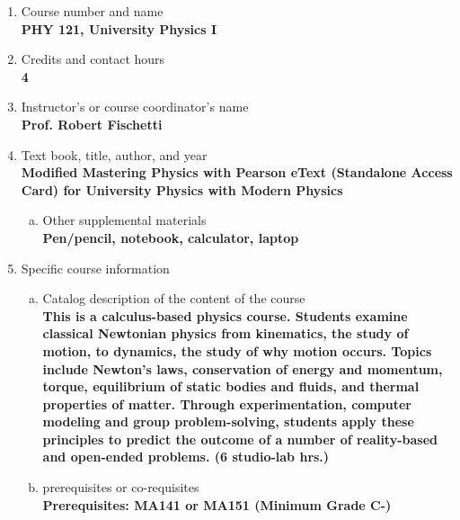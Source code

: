 \label{PHY121}  %
\begin{enumerate}[1.]
\item Course number and name\\
  {\bfseries
PHY 121, University Physics I
  }

\item Credits and contact hours\\
  {\bfseries
4
  }

\item Instructor's or course coordinator's name\\
  {\bfseries
Prof. Robert Fischetti
  }

\item Text book, title, author, and year\\
  {\bfseries
    Modified Mastering Physics with Pearson eText (Standalone Access Card) for University Physics with Modern Physics
  }
\begin{enumerate}[a.]
\item Other supplemental materials\\
  {\bfseries
    Pen/pencil, notebook, calculator, laptop
  }
\end{enumerate}

\item Specific course information
\begin{enumerate}[a.]
\item Catalog description of the content of the course\\
  {\bfseries
This is a calculus-based physics course. Students examine classical Newtonian physics from kinematics, the study of motion, to dynamics, the study of why motion occurs. Topics include Newton's laws, conservation of energy and momentum, torque, equilibrium of static bodies and fluids, and thermal properties of matter. Through experimentation, computer modeling and group problem-solving, students apply these principles to predict the outcome of a number of reality-based and open-ended problems. (6 studio-lab hrs.)
  }

\item prerequisites or co-requisites\\
  {\bfseries
    Prerequisites: MA141 or MA151 (Minimum Grade C-)
  }


\end{enumerate}
\end{enumerate}
